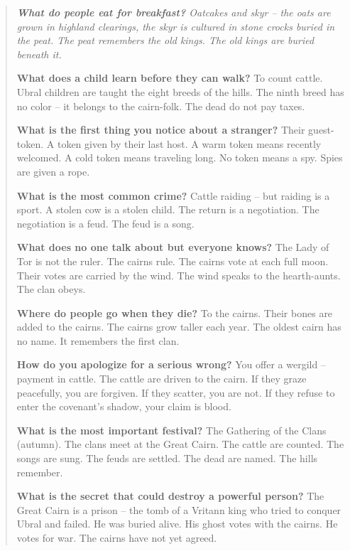 \documentclass[12pt,oneside]{book}
\newenvironment{almanac}
  {\begin{quote}\small\itshape}
  {\end{quote}}
\begin{document}
\vspace{1em}
\begin{almanac}
\textbf{What do people eat for breakfast?} Oatcakes and skyr -- the oats are grown in highland clearings, the skyr is cultured in stone crocks buried in the peat. The peat remembers the old kings. The old kings are buried beneath it.

\textbf{What does a child learn before they can walk?} To count cattle. Ubral children are taught the eight breeds of the hills. The ninth breed has no color -- it belongs to the cairn-folk. The dead do not pay taxes.

\textbf{What is the first thing you notice about a stranger?} Their guest-token. A token given by their last host. A warm token means recently welcomed. A cold token means traveling long. No token means a spy. Spies are given a rope.

\textbf{What is the most common crime?} Cattle raiding -- but raiding is a sport. A stolen cow is a stolen child. The return is a negotiation. The negotiation is a feud. The feud is a song.

\textbf{What does no one talk about but everyone knows?} The Lady of Tor is not the ruler. The cairns rule. The cairns vote at each full moon. Their votes are carried by the wind. The wind speaks to the hearth-aunts. The clan obeys.

\textbf{Where do people go when they die?} To the cairns. Their bones are added to the cairns. The cairns grow taller each year. The oldest cairn has no name. It remembers the first clan.

\textbf{How do you apologize for a serious wrong?} You offer a wergild -- payment in cattle. The cattle are driven to the cairn. If they graze peacefully, you are forgiven. If they scatter, you are not. If they refuse to enter the covenant's shadow, your claim is blood.

\textbf{What is the most important festival?} The Gathering of the Clans (autumn). The clans meet at the Great Cairn. The cattle are counted. The songs are sung. The feuds are settled. The dead are named. The hills remember.

\textbf{What is the secret that could destroy a powerful person?} The Great Cairn is a prison -- the tomb of a Vritann king who tried to conquer Ubral and failed. He was buried alive. His ghost votes with the cairns. He votes for war. The cairns have not yet agreed.
\end{almanac}


\end{document}
